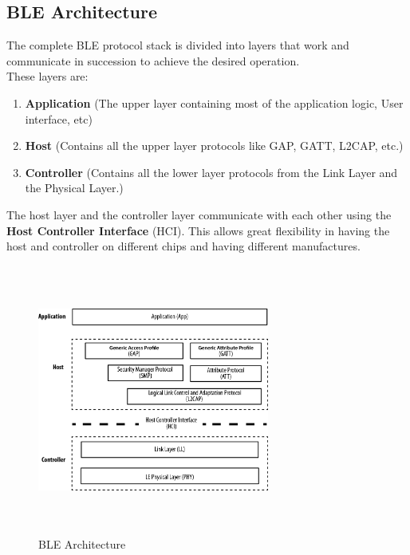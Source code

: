 \subsection{BLE Architecture}
The complete BLE protocol stack is divided into layers that work and communicate in succession to achieve the desired operation.\\
These layers are:
\begin{enumerate}
	\item \textbf{Application} (The upper layer containing most of the application logic, User interface, etc)
	\item \textbf{Host} (Contains all the upper layer protocols like GAP, GATT, L2CAP, etc.)
	\item \textbf{Controller} (Contains all the lower layer protocols from the Link Layer and the Physical Layer.)
\end{enumerate}
The host layer and the controller layer communicate with each other using the \textbf{Host Controller Interface} (HCI). This allows great flexibility in having the host and controller on different chips and having different manufactures.
\begin{figure}[ht]
	\centering
	\includegraphics[width=3in, height=3.5in]{images/ble_architecture.png}
	\caption{BLE Architecture}
\end{figure}
